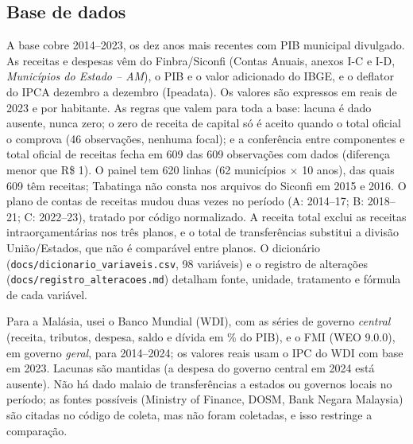 \documentclass[10pt,twocolumn]{article}
\begin{document}
\subsection{Base de dados}
A base cobre 2014--2023, os dez anos mais recentes com PIB municipal divulgado. As receitas e despesas vêm do Finbra/Siconfi (Contas Anuais, anexos I-C e I-D, \textit{Municípios do Estado -- AM}), o PIB e o valor adicionado do IBGE, e o deflator do IPCA dezembro a dezembro (Ipeadata). Os valores são expressos em reais de 2023 e por habitante. As regras que valem para toda a base: lacuna é dado ausente, nunca zero; o zero de receita de capital só é aceito quando o total oficial o comprova (46 observações, nenhuma focal); e a conferência entre componentes e total oficial de receitas fecha em 609 das 609 observações com dados (diferença menor que R\$ 1). O painel tem 620 linhas (62 municípios $\times$ 10 anos), das quais 609 têm receitas; Tabatinga não consta nos arquivos do Siconfi em 2015 e 2016. O plano de contas de receitas mudou duas vezes no período (A: 2014--17; B: 2018--21; C: 2022--23), tratado por código normalizado. A receita total exclui as receitas intraorçamentárias nos três planos, e o total de transferências substitui a divisão União/Estados, que não é comparável entre planos. O dicionário (\texttt{docs/dicionario\_variaveis.csv}, 98 variáveis) e o registro de alterações (\texttt{docs/registro\_alteracoes.md}) detalham fonte, unidade, tratamento e fórmula de cada variável.

Para a Malásia, usei o Banco Mundial (WDI), com as séries de governo \textit{central} (receita, tributos, despesa, saldo e dívida em \% do PIB), e o FMI (WEO 9.0.0), em governo \textit{geral}, para 2014--2024; os valores reais usam o IPC do WDI com base em 2023. Lacunas são mantidas (a despesa do governo central em 2024 está ausente). Não há dado malaio de transferências a estados ou governos locais no período; as fontes possíveis (Ministry of Finance, DOSM, Bank Negara Malaysia) são citadas no código de coleta, mas não foram coletadas, e isso restringe a comparação.
\end{document}
